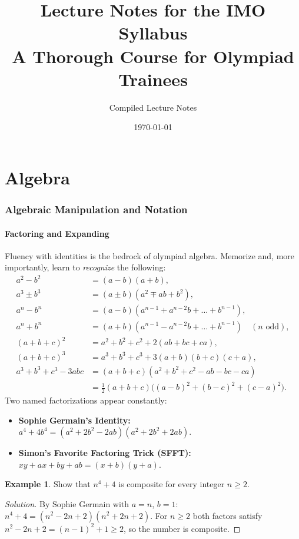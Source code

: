 \documentclass[11pt]{article}
\title{Lecture Notes for the IMO Syllabus\\
\large A Thorough Course for Olympiad Trainees}
\author{Compiled Lecture Notes}
\date{\today}
\theoremstyle{plain}
\theoremstyle{definition}
\newtheorem{example}[theorem]{Example}
\newenvironment{solution}{\begin{proof}[Solution]}{\end{proof}}
\begin{document}
\maketitle
\tableofcontents
\newpage

\part{Algebra}
\section{Algebraic Manipulation and Notation}

\subsection{Factoring and Expanding}
Fluency with identities is the bedrock of olympiad algebra. Memorize and,
more importantly, learn to \emph{recognize} the following:
\begin{align*}
a^2-b^2 &= (a-b)(a+b),\\
a^3 \pm b^3 &= (a\pm b)(a^2 \mp ab + b^2),\\
a^n - b^n &= (a-b)(a^{n-1}+a^{n-2}b+\dots+b^{n-1}),\\
a^n + b^n &= (a+b)(a^{n-1}-a^{n-2}b+\dots+b^{n-1}) \quad (n \text{ odd}),\\
(a+b+c)^2 &= a^2+b^2+c^2+2(ab+bc+ca),\\
(a+b+c)^3 &= a^3+b^3+c^3+3(a+b)(b+c)(c+a),\\
a^3+b^3+c^3-3abc &= (a+b+c)(a^2+b^2+c^2-ab-bc-ca)\\
&= \frac{1}{2}(a+b+c)\bigl((a-b)^2+(b-c)^2+(c-a)^2\bigr).
\end{align*}
Two named factorizations appear constantly:
\begin{itemize}
\item \textbf{Sophie Germain's Identity:} $a^4 + 4b^4 = (a^2+2b^2-2ab)(a^2+2b^2+2ab)$.
\item \textbf{Simon's Favorite Factoring Trick (SFFT):} $xy + ax + by + ab = (x+b)(y+a)$.
\end{itemize}

\begin{example}
Show that $n^4 + 4$ is composite for every integer $n \ge 2$.
\end{example}
\begin{solution}
By Sophie Germain with $a=n$, $b=1$:
$n^4+4 = (n^2-2n+2)(n^2+2n+2)$.
For $n\ge 2$ both factors satisfy $n^2-2n+2 = (n-1)^2+1 \ge 2$, so the number is composite.
\end{solution}
\end{document}
